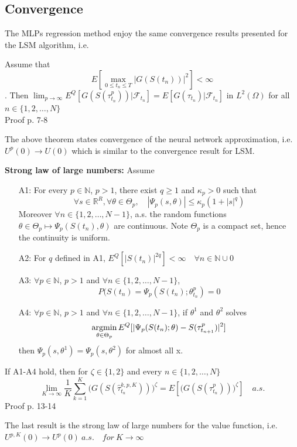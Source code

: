 \subsection{Convergence}
The MLPs regression method enjoy the same convergence results presented for the LSM algorithm, i.e.
\begin{theorem}\label{NNConvergence1}
Assume that 
$$E[\max_{0\leq t_n \leq T} |G(S(t_n))|^2]< \infty$$. 
Then $\lim_{p \to \infty} E^Q[G(S(\tau^{p}_{t_n}))| \mathcal{F}_{t_n}]= E[G(\tau_{t_n})|\mathcal{F}_{t_n}]$ in $L^2(\Omega)$ for all $n \in \{1,2,\ldots, N\}$\\
Proof p. 7-8 \parencite{Lelong19}
\end{theorem}
The above theorem states convergence of the neural network approximation, i.e. $U^{p}(0) \to U(0)$ which is similar to the convergence result for LSM. 
\begin{theorem}{\textbf{Strong law of large numbers: }}\label{NNConvergence2}
Assume
\begin{enumerate}
\item[A1:] For every $p\in \mathbb{N}$, $p>1$, there exist $q \geq 1$ and $\kappa_p>0$ such that
$$\forall s \in \mathbb{R}^{R}, \forall \theta \in \Theta_p, \quad |\Psi_p(s,\theta)| \leq \kappa_p (1+|s|^q) $$
Moreover $\forall n \in \{1,2,\ldots, N-1\}$, a.s. the random functions $\theta \in \Theta_p \mapsto \Psi_p(S(t_n), \theta)$ are continuous. Note $\Theta_p$ is a compact set, hence the continuity is uniform.
\item[A2:] For $q$ defined in A1, $E^Q[|S(t_n)|^{2q}]<\infty \quad \forall n \in \mathbb{N} \cup 0$
\item[A3:] $\forall p \in \mathbb{N}$, $p>1$ and $\forall n \in \{1,2,\ldots, N-1\}$, 
$$P(S(t_n)=\Psi_{p}(S(t_n);\theta_{t_n}^{p})=0$$
\item[A4:] $\forall p \in \mathbb{N}$, $p>1$ and $\forall n \in \{1,2,\ldots, N-1\}$, if $\theta^{1}$ and $\theta^{2}$ solves 
\begin{align*}
\operatorname*{argmin}_{\theta \in \Theta_p} E^Q[|\Psi_p(S(t_n); \theta)- S(\tau_{t_{n+1}}^{p})|^2]
\end{align*}
then $\Psi_p(s,\theta^{1})=\Psi_p(s,\theta^{2})$ for almost all x.
\end{enumerate}
If A1-A4 hold, then for $\zeta\in \{1,2\}$ and every $n\in \{1,2,\ldots,N\}$
\begin{equation}
\lim_{K\to \infty} \dfrac{1}{K} \sum_{k=1}^{K} \bigg(G(S(\hat{\tau}_{t_n}^{k,p,K}))\bigg)^{\zeta} = E[\bigg(G(S(\tau_{t_n}^{p}))\bigg)^{\zeta}] \quad a.s.
\end{equation}
Proof p. 13-14 \parencite{Lelong19}
\end{theorem}
The last result is the strong law of large numbers for the value function, i.e. $U^{p,K}(0) \to U^{p}(0) \ a.s. \quad for \ K \to \infty$
\newpage


